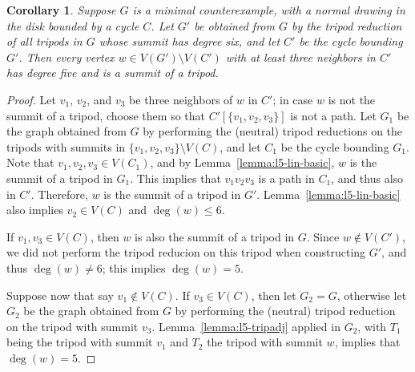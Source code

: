 \documentclass[12pt,twoside,openright,a4paper]{book}
\newtheorem{corollary}[theorem]{Corollary}
\begin{document}
\begin{corollary}\label{cor:l5-onelevel}
Suppose $G$ is a minimal counterexample, with a normal drawing in the disk bounded by a cycle $C$.
Let $G'$ be obtained from $G$ by the tripod reduction of all tripods in $G$ whose summit has degree six,
and let $C'$ be the cycle bounding $G'$.  Then every vertex $w\in V(G')\setminus V(C')$ with at least three
neighbors in $C'$ has degree five and is a summit of a tripod.
\end{corollary}
\begin{proof}
Let $v_1$, $v_2$, and $v_3$ be three neighbors of $w$ in $C'$; in case $w$ is not the summit of a tripod,
choose them so that $C'[\{v_1,v_2,v_3\}]$ is not a path.  Let $G_1$ be the graph obtained from $G$ by
performing the (neutral) tripod reductions on the tripods with summits in $\{v_1,v_2,v_3\}\setminus V(C)$,
and let $C_1$ be the cycle bounding $G_1$.  Note that $v_1,v_2,v_3\in V(C_1)$, and by Lemma~\ref{lemma:l5-lin-basic},
$w$ is the summit of a tripod in $G_1$.  This implies that $v_1v_2v_3$ is a path in $C_1$, and thus also in $C'$.
Therefore, $w$ is the summit of a tripod in $G'$.  Lemma~\ref{lemma:l5-lin-basic} also implies $v_2\in V(C)$
and $\deg(w)\le 6$.

If $v_1,v_3\in V(C)$, then $w$ is also the summit of a tripod in $G$.  Since $w\not\in V(C')$, we did not perform
the tripod reducion on this tripod when constructing $G'$, and thus $\deg(w)\neq 6$; this implies $\deg(w)=5$.

Suppose now that say $v_1\not\in V(C)$.  If $v_3\in V(C)$, then let $G_2=G$, otherwise let $G_2$ be the graph obtained
from $G$ by performing the (neutral) tripod reduction on the tripod with summit $v_3$.  Lemma~\ref{lemma:l5-tripadj}
applied in $G_2$, with $T_1$ being the tripod with summit $v_1$ and $T_2$ the tripod with summit $w$,
implies that $\deg(w)=5$.
\end{proof}
\end{document}
